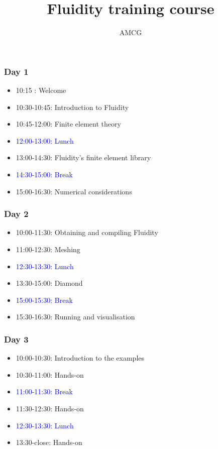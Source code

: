 \documentclass[12pt]{beamer}
\title[Training]{Fluidity training course}
\subtitle[]{}
\institute{ Dept of Earth Science and Engineering, Imperial College London}
\author[AMCG]{\large{AMCG}}
\date{}
\begin{document}
\begin{frame}
  \titlepage
\end{frame}

\begin{frame}
    \frametitle{Day 1}
    \begin{itemize}[]
        \item[] 10:15      : Welcome
        \item[] 10:30-10:45: Introduction to Fluidity
        \item[] 10:45-12:00: Finite element theory
        \item[] \textcolor{blue}{12:00-13:00: Lunch}
        \item[] 13:00-14:30: Fluidity's finite element library
        \item[] \textcolor{blue}{14:30-15:00: Break}
        \item[] 15:00-16:30: Numerical considerations
\end{itemize}
\end{frame}


\begin{frame}
    \frametitle{Day 2}
    \begin{itemize}[]
        \item[] 10:00-11:30: Obtaining and compiling Fluidity
        \item[] 11:00-12:30: Meshing
        \item[] \textcolor{blue}{12:30-13:30: Lunch}
        \item[] 13:30-15:00: Diamond
        \item[] \textcolor{blue}{15:00-15:30: Break}
        \item[] 15:30-16:30: Running and visualisation
\end{itemize}
\end{frame}

\begin{frame}
    \frametitle{Day 3}
    \begin{itemize}[]
        \item[] 10:00-10:30: Introduction to the examples
        \item[] 10:30-11:00: Hands-on
        \item[] \textcolor{blue}{11:00-11:30: Break}
        \item[] 11:30-12:30: Hands-on
        \item[] \textcolor{blue}{12:30-13:30: Lunch}
        \item[] 13:30-close: Hands-on
\end{itemize}

\end{frame}
\end{document}
